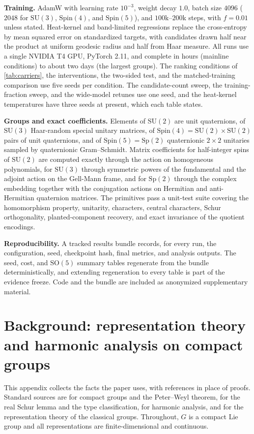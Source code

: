 \documentclass{article}
\newcommand{\SU}{\mathrm{SU}}
\newcommand{\SO}{\mathrm{SO}}
\newcommand{\Spin}{\mathrm{Spin}}
\newcommand{\Sp}{\mathrm{Sp}}
\begin{document}
\textbf{Training.} AdamW with learning rate $10^{-3}$, weight decay
$1.0$, batch size $4096$ ($2048$ for $\SU(3)$, $\Spin(4)$, and
$\Spin(5)$), and $100$k--$200$k steps, with $f = 0.01$ unless stated.
Heat-kernel and band-limited regressions replace the cross-entropy by
mean squared error on standardized targets, with candidates drawn half
near the product at uniform geodesic radius and half from Haar measure.
All runs use a single NVIDIA T4 GPU, PyTorch 2.11, and complete in hours
(mainline conditions) to about two days (the largest groups). The
ranking conditions of \cref{tab:carriers}, the interventions, the
two-sided test, and the matched-training comparison use five seeds per
condition. The candidate-count sweep, the training-fraction sweep, and
the wide-model retunes use one seed, and the heat-kernel temperatures
have three seeds at present, which each table states.

\textbf{Groups and exact coefficients.} Elements of $\SU(2)$ are unit
quaternions, of $\SU(3)$ Haar-random special unitary matrices, of
$\Spin(4) = \SU(2) \times \SU(2)$ pairs of unit quaternions, and of
$\Spin(5) = \Sp(2)$ quaternionic $2 \times 2$ unitaries sampled by
quaternionic Gram--Schmidt. Matrix coefficients for half-integer spins
of $\SU(2)$ are computed exactly through the action on homogeneous
polynomials, for $\SU(3)$ through symmetric powers of the fundamental
and the adjoint action on the Gell-Mann frame, and for $\Sp(2)$ through
the complex embedding together with the conjugation actions on
Hermitian and anti-Hermitian quaternion matrices. The primitives pass a
unit-test suite covering the homomorphism property, unitarity,
characters, central characters, Schur orthogonality,
planted-component recovery, and exact invariance of the quotient
encodings.

\textbf{Reproducibility.} A tracked results bundle records, for every
run, the configuration, seed, checkpoint hash, final metrics, and
analysis outputs. The seed, cost, and $\SO(5)$ summary tables regenerate
from the bundle deterministically, and extending regeneration to every
table is part of the evidence freeze. Code and the bundle are included
as anonymized supplementary material.

\section{Background: representation theory and harmonic analysis on compact groups}
\label{app:background}

This appendix collects the facts the paper uses, with references in
place of proofs. Standard sources are \cite{brocker1985} for compact
groups and the Peter--Weyl theorem, \cite{sepanski2007} for the real
Schur lemma and the type classification, \cite{folland1995} for
harmonic analysis, and \cite{fulton1991} for the representation theory
of the classical groups. Throughout, $G$ is a compact Lie group and all
representations are finite-dimensional and continuous.
\end{document}
